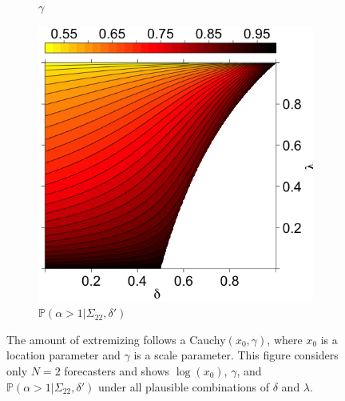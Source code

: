\documentclass[11pt]{article}
\renewcommand{\P}{\mathbb{P}}
\theoremstyle{definition}
\theoremstyle{definition}
\def\P{{\mathbb P}}
\begin{document}
\begin{figure}[t]
\begin{subfigure}[b]{0.33\textwidth}
\caption{$\gamma$}
\label{gammaOracle}
        \end{subfigure}
\hspace{-1.3em}
    \begin{subfigure}[b]{0.33\textwidth}
        \includegraphics[width=1.07\textwidth, height = \textwidth]{Probs}
\caption{$\P(\alpha > 1 | \Sigma_{22}, \delta')$}
\label{probOracle}
        \end{subfigure}

    \caption{ The amount of extremizing follows a 
Cauchy$(x_0, \gamma)$, where $x_0$ is a location parameter and $\gamma$ 
is a scale parameter.  This figure considers only $N = 2$ forecasters and 
shows $\log(x_0)$, $\gamma$, and $\P(\alpha > 1 | \Sigma_{22}, \delta')$ 
under all plausible combinations of $\delta$ and $\lambda$.}
        \label{LevelplotsOracle}
\end{figure}
 
\end{document}
